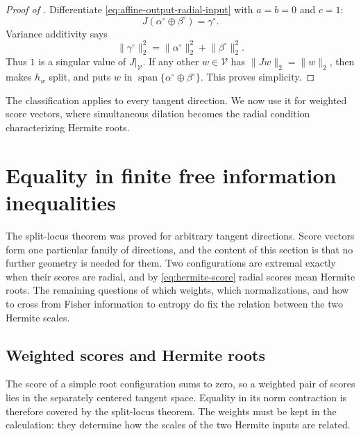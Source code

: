 \documentclass[12pt,reqno]{amsart}
\theoremstyle{definition}
\theoremstyle{remark}
\begin{document}
\begin{proof}[Proof of ]
Differentiate
\eqref{eq:affine-output-radial-input} with \(a=b=0\) and \(c=1\):
\begin{equation}\label{eq:radial-jacobian-vector}
 J(\alpha^\circ\oplus\beta^\circ)=\gamma^\circ.
\end{equation}
Variance additivity says
\begin{equation}\label{eq:radial-norm-additivity}
 \lVert\gamma^\circ\rVert_2^2
 =\lVert\alpha^\circ\rVert_2^2
  +\lVert\beta^\circ\rVert_2^2.
\end{equation}
Thus \(1\) is a singular value of \(J|_{\mathcal V}\).  If any other
\(w\in\mathcal V\) has \(\lVert Jw\rVert_2=\lVert w\rVert_2\), then
 makes \(h_w\) split, and 
puts \(w\) in
\(\operatorname{span}\{\alpha^\circ\oplus\beta^\circ\}\).  This proves
simplicity.
\end{proof}

The classification applies to every tangent direction.  We now use it for
weighted score vectors, where simultaneous dilation becomes the radial
condition characterizing Hermite roots.

\section{Equality in finite free information inequalities}
\label{sec:information-equality}

The split-locus theorem was proved for arbitrary tangent directions.  Score vectors form one particular family of directions, and the content of this section is that no further geometry is needed for them. Two configurations are extremal exactly when their scores are radial, and by \eqref{eq:hermite-score} radial scores mean Hermite roots. The remaining questions of which weights, which normalizations, and how to cross from Fisher information to entropy do fix the relation between the two Hermite scales.

\subsection{Weighted scores and Hermite roots}

The score of a simple root configuration sums to zero, so a weighted pair
of scores lies in the separately centered tangent space.  Equality in its
norm contraction is therefore covered by the split-locus theorem.  The
weights must be kept in the calculation: they determine how the scales of
the two Hermite inputs are related.
\end{document}
